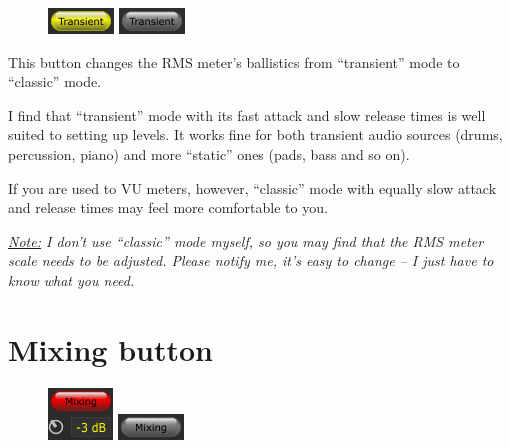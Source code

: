 \begin{figure}
  \includegraphics[scale=\screenshotscale,clip]{include/images/button_transient_on.png}
  \newline \vspace{-0.9\baselineskip}
  \includegraphics[scale=\screenshotscale,clip]{include/images/button_transient_off.png}
\end{figure}

This button changes the RMS meter's ballistics from ``transient'' mode
to ``classic'' mode.

I find that ``transient'' mode with its fast attack and slow release
times is well suited to setting up levels.  It works fine for both
transient audio sources (drums, percussion, piano) and more ``static''
ones (pads, bass and so on).

If you are used to VU meters, however, ``classic'' mode with equally
slow attack and release times may feel more comfortable to you.

\emph{\underline{Note:} I don't use ``classic'' mode myself, so you
  may find that the RMS meter scale needs to be adjusted.  Please
  notify me, it's easy to change -- I just have to know what you
  need.}

\section{Mixing button}
\label{sec:controls_mixing_button}

\begin{figure}
  \includegraphics[scale=\screenshotscale,clip]{include/images/button_mixing_on.png}
  \newline \vspace{-0.9\baselineskip}
  \includegraphics[scale=\screenshotscale,clip]{include/images/button_mixing_off.png}
\end{figure}

